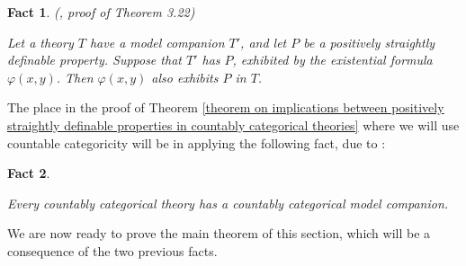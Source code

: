 \documentclass{article}
\newtheorem{fact}{Fact}
\theoremstyle{definition}
\theoremstyle{definition}
\theoremstyle{definition}
\begin{document}
\begin{fact}\label{preservation under model companions}
(\cite{bodirsky2025taking}, proof of Theorem 3.22)

Let a theory $T$ have a model companion $T'$, and let $P$ be a positively straightly definable property. Suppose that $T'$ has $P$, exhibited by the \emph{existential} formula $\varphi(x, y)$. Then $\varphi(x, y)$ also exhibits $P$ in $T$.
\end{fact}


The place in the proof of Theorem \ref{theorem on implications between positively straightly definable properties in countably categorical theories} where we will use countable categoricity will be in applying the following fact, due to \cite{saracino1973model}:

\begin{fact}\label{countably categorical theories have model companions}

Every countably categorical theory has a countably categorical model companion.

\end{fact}

We are now ready to prove the main theorem of this section, which will be a consequence of the two previous facts.
\end{document}
